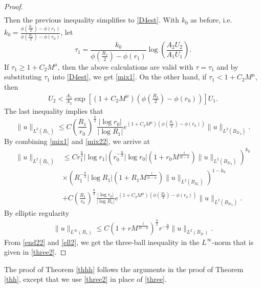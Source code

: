 \documentclass[11pt]{amsart}
\theoremstyle{plain}
\numberwithin{equation}{section}
\begin{document}
\begin{proof}
\begin{align*}
\end{align*}
Then the previous inequality simplifies to \eqref{D4est}.
With $k_0$ as before, i.e. $k_0=\frac{\phi(\frac{R_1}{2})-\phi(r_1)}{\phi(\frac{R_1}{2})-\phi(r_0)}$,
let
$$\tau_1 =\frac{k_0}{\phi{\left( {\frac{R_1}{2}} \right) }-\phi(r_1)}\log{\left( {\frac{A_2{U}_2}{A_1 {U}_1}} \right) }.$$
If $\tau_1 \ge 1 + C_2 M^\mu$, then the above calculations are valid with $\tau = \tau_1$ and by substituting $\tau_1$ into \eqref{D4est}, we get \eqref{mix1}.
On the other hand, if $\tau_1 < 1 + C_2 M^\mu$, then
\begin{align*}
U_2
< \frac{A_1}{A_2} \exp{\left[{{\left( {1 + C_2 M^\mu} \right) } {\left( {\phi{\left( {\frac{R_1}{2}} \right) }-\phi(r_0)} \right) }}\right]} U_1.
\end{align*}
The last inequality implies that
\begin{equation}
\|u\|_{L^2 (B_{r_1})}
\le C {\left( {\frac{R_1}{r_0}} \right) }^{\frac n 2}\frac{{\left\vert{\log r_0}\right\vert}}{{\left\vert{\log R_1}\right\vert}} e^{{\left( {1 + C_2 M^\mu} \right) } {\left( {\phi{\left( {\frac{R_1}{2}} \right) }-\phi(r_0)} \right) }} \|u\|_{L^2(B_{2r_0})}.
\label{mix22}
\end{equation}
By combining \eqref{mix1} and \eqref{mix22}, we arrive at
\begin{align}
\| u\|_{L^2 (B_{r_1})}
&\le C r_1^{\frac n 2} |\log r_1|  {\left( { r_0^{- \frac n 2} |\log r_0| {\left( {1+r_0M^{\frac{t}{2t-n}}} \right) } \|u\|_{L^2(B_{2r_0})}} \right) }^{k_0} \nonumber \\
&\times{\left( { R_1^{- \frac n 2}|\log R_1| {\left( {1+R_1M^{\frac{t}{2t-n}}} \right) } \|u\|_{L^2(B_{R_1})}} \right) }^{1 - k_0} \nonumber  \\
&+C {\left( {\frac{R_1}{r_0}} \right) }^{\frac n 2}\frac{{\left\vert{\log r_0}\right\vert}}{{\left\vert{\log R_1}\right\vert}} e^{{\left( {1 + C_2 M^\mu} \right) } {\left( {\phi{\left( {\frac{R_1}{2}} \right) }-\phi(r_0)} \right) }} \|u\|_{L^2(B_{2r_0})}.
 \label{end22}
\end{align}
By elliptic regularity
\begin{align}
\|u\|_{L^\infty(B_r)}
\le C{\left( {1 + r M^{\frac{t}{2t-n}}} \right) }^{\frac n 2}r^{- \frac n 2}\|u\|_{L^2(B_{2r})}.
\label{ell2}
\end{align}
From \eqref{end22} and \eqref{ell2}, we get the three-ball inequality in the $L^\infty$-norm that is given in \eqref{three2}.
\end{proof}

The proof of Theorem \ref{thhh} follows the arguments in the proof of Theorem \ref{thh}, except that we use \eqref{three2} in place of \eqref{three}.
\end{document}
